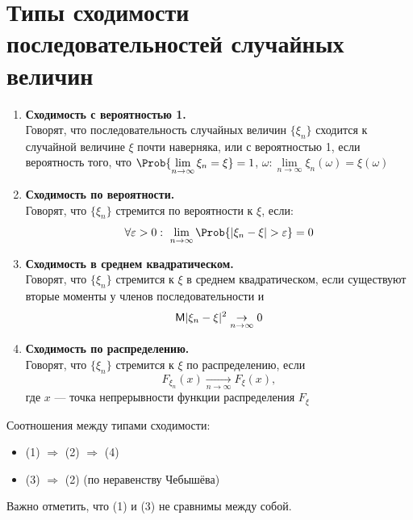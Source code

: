 \section{Типы сходимости последовательностей случайных величин}
\begin{enumerate}[wide, labelwidth=!, labelindent=0pt]
	\item \textbf{Сходимость с вероятностью 1.}  \\
 	Говорят, что последовательность случайных величин $\{ \xi_n \}$ сходится к случайной величине $\xi$ почти наверняка, или с вероятностью 1, если вероятность того, что $\Prob \{ \lim\limits_{n \to \infty} \xi_n = \xi \} = 1$, $\omega: \lim\limits_{n \to \infty} \xi_n (\omega) = \xi (\omega)$
	\item \textbf{Сходимость по вероятности.}  \\
	Говорят, что $\{ \xi_n \}$ стремится по вероятности к $\xi$, если:
	\[
		\forall \varepsilon > 0: \ \lim\limits_{n \to \infty} \Prob \{ |\xi_n - \xi | > \varepsilon \} = 0
	\]
	\item \textbf{Сходимость в среднем квадратическом.}  \\
	Говорят, что $\{ \xi_n \}$ стремится к $\xi$ в среднем квадратическом, если существуют вторые моменты у членов последовательности и 
	\[
		\mathsf{M} | \xi_n - \xi |^2 \underset{n \to \infty}{\rightarrow} 0
	\]
	\item \textbf{Сходимость по распределению.}  \\
	Говорят, что $\{ \xi_n \}$ стремится к $\xi$ по распределению, если
	\[
		F_{\xi_n} (x) \underset{n \to \infty}{\rightarrow} F_{\xi} (x),
	\]
	где $x$ --- точка непрерывности функции распределения $F_{\xi}$
\end{enumerate}
Соотношения между типами сходимости:
\begin{itemize}
	\item (1) $\Rightarrow$ (2) $\Rightarrow$ (4)
 	\item (3) $\Rightarrow$ (2) (по неравенству Чебышёва)
\end{itemize}
Важно отметить, что (1) и (3) не сравнимы между собой.

